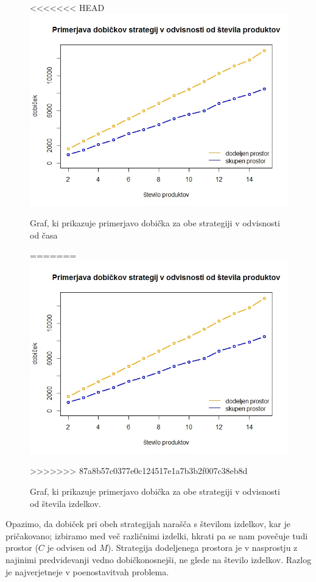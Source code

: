 \documentclass[a4paper]{article}
\begin{document}
\begin{figure}[ht]
<<<<<<< HEAD
\includegraphics [scale = 0.68]{primerjava-strategij-stevilo-produktov}
\caption{Graf, ki prikazuje primerjavo dobička za obe strategiji v odvisnosti od časa}
=======
\includegraphics [scale = 0.6]{primerjava-strategij-stevilo-produktov}
\caption{Graf, ki prikazuje primerjavo dobička za obe strategiji v odvisnosti od števila izdelkov.}
>>>>>>> 87a8b57c0377e0c124517e1a7b3b2f007c38eb8d
\end{figure}


Opazimo, da dobiček pri obeh strategijah narašča s številom izdelkov, kar je pričakovano; izbiramo med več različnimi izdelki, hkrati pa se nam povečuje tudi prostor ($C$ je odvisen od $M$). Strategija dodeljenega prostora je v nasprostju z najinimi predvidevanji vedno dobičkonosnejši, ne glede na število izdelkov. Razlog je najverjetneje v poenostavitvah problema. 
\end{document}
